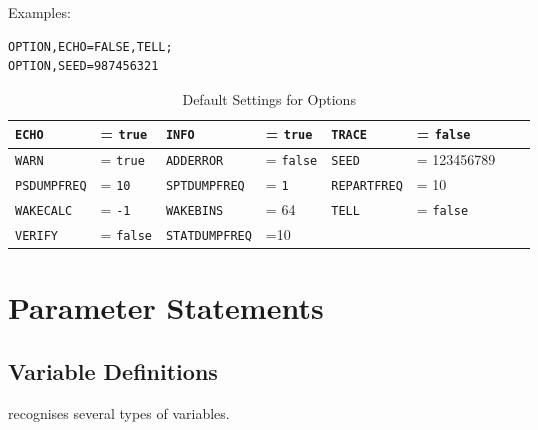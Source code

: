 \noindent Examples:
\begin{verbatim}
OPTION,ECHO=FALSE,TELL;
OPTION,SEED=987456321
\end{verbatim}

\begin{table}[ht] \footnotesize
  \caption{Default Settings for Options}
  \label{tab:option}
  \begin{center}
    \begin{tabular}{|ll|ll|ll|ll|}
      \hline
      \texttt{ECHO}     & = \texttt{true}  &
      \texttt{INFO}     & = \texttt{true}  &
      \texttt{TRACE}    & = \texttt{false} \\
      \hline
      \texttt{WARN}     & = \texttt{true } &
      \texttt{ADDERROR} & = \texttt{false} &
      \texttt{SEED}     & = 123456789      \\
      \hline
       \texttt{PSDUMPFREQ}     & = \texttt{10 } &
      \texttt{SPTDUMPFREQ} & = \texttt{1} &
      \texttt{REPARTFREQ}     & = 10  \\
      \hline
            \texttt{WAKECALC}     & = \texttt{-1 } &
      \texttt{WAKEBINS}     &  = 64 &
        \texttt{TELL}     & = \texttt{false} \\
       \hline
         \texttt{VERIFY}   & = \texttt{false} &
         \texttt{STATDUMPFREQ}     & =10  &
           \texttt{}     & & \\
             \hline
    \end{tabular}
  \end{center}
\end{table}

\section{Parameter Statements}
\label{sec:parameter}

\subsection{Variable Definitions}
\label{sec:variable}
\opal recognises several types of variables.

